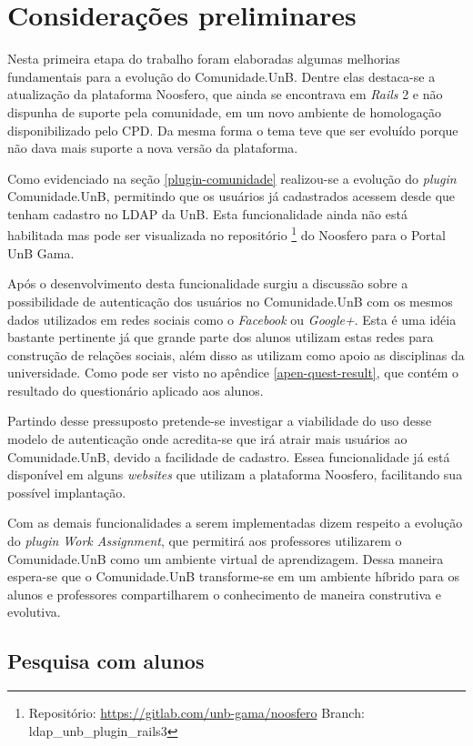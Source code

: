 \chapter{Considerações preliminares}
\label{consideracoes-preliminares}

Nesta primeira etapa do trabalho foram elaboradas algumas melhorias fundamentais para a evolução do Comunidade.UnB. Dentre elas destaca-se a atualização da plataforma Noosfero, que ainda se encontrava em \textit{Rails} 2 e não dispunha de suporte pela comunidade, em um novo ambiente de homologação disponibilizado pelo CPD. Da mesma forma o tema teve que ser evoluído porque não dava mais suporte a nova versão da plataforma.

Como evidenciado na seção \ref{plugin-comunidade} realizou-se a evolução do \textit{plugin} Comunidade.UnB, permitindo que os usuários já cadastrados acessem desde que tenham cadastro no LDAP da UnB. Esta funcionalidade ainda não está habilitada mas pode ser visualizada no repositório \footnote{Repositório: \url{https://gitlab.com/unb-gama/noosfero} Branch: ldap\_unb\_plugin\_rails3 } do Noosfero para o Portal UnB Gama.

Após o desenvolvimento desta funcionalidade surgiu a discussão sobre a possibilidade de autenticação dos usuários no Comunidade.UnB com os mesmos dados utilizados em redes sociais como o \textit{Facebook} ou \textit{Google+}. Esta é uma idéia bastante pertinente já que grande parte dos alunos utilizam estas redes para construção de relações sociais, além disso as utilizam como apoio as disciplinas da universidade. Como pode ser visto no apêndice \ref{apen-quest-result}, que contém o resultado do questionário aplicado aos alunos.

Partindo desse pressuposto pretende-se investigar a viabilidade do uso desse modelo de autenticação onde acredita-se que irá atrair mais usuários ao Comunidade.UnB, devido a facilidade de cadastro. Essea funcionalidade já está disponível em alguns \textit{websites} que utilizam a plataforma Noosfero, facilitando sua possível implantação.

Com as demais funcionalidades a serem implementadas dizem respeito a evolução do \textit{plugin Work Assignment}, que permitirá aos professores utilizarem o Comunidade.UnB como um ambiente virtual de aprendizagem. Dessa maneira espera-se que o Comunidade.UnB transforme-se em um ambiente híbrido para os alunos e professores compartilharem o conhecimento de maneira construtiva e evolutiva.

\section{Pesquisa com alunos}
\label{pesquisa-alunos}

